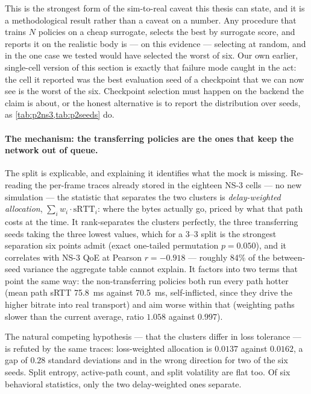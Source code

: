 This is the strongest form of the sim-to-real caveat this thesis can state, and it is a methodological
result rather than a caveat on a number. Any procedure that trains $N$ policies on a cheap surrogate,
selects the best by surrogate score, and reports it on the realistic body is --- on this evidence ---
selecting at random, and in the one case we tested would have selected the worst of six. Our own
earlier, single-cell version of this section is exactly that failure mode caught in the act: the cell it
reported was the best evaluation seed of a checkpoint that we can now see is the worst of the six.
Checkpoint selection must happen on the backend the claim is about, or the honest alternative is to
report the distribution over seeds, as \cref{tab:p2ns3,tab:p2seeds} do.

\paragraph{The mechanism: the transferring policies are the ones that keep the network out of queue.}
The split is explicable, and explaining it identifies what the mock is missing. Re-reading the per-frame
traces already stored in the eighteen NS-3 cells --- no new simulation --- the statistic that separates
the two clusters is \emph{delay-weighted allocation}, $\sum_i w_i \cdot \mathrm{sRTT}_i$: where the bytes
actually go, priced by what that path costs at the time. It rank-separates the clusters perfectly, the
three transferring seeds taking the three lowest values, which for a 3--3 split is the strongest
separation six points admit (exact one-tailed permutation $p = 0.050$), and it correlates with NS-3 QoE
at Pearson $r = -0.918$ --- roughly 84\% of the between-seed variance the aggregate table cannot explain.
It factors into two terms that point the same way: the non-transferring policies both run every path
hotter (mean path sRTT \SI{75.8}{\milli\second} against \SI{70.5}{\milli\second}, self-inflicted, since
they drive the higher bitrate into real transport) and aim worse within that (weighting paths slower
than the current average, ratio $1.058$ against $0.997$).

The natural competing hypothesis --- that the clusters differ in loss tolerance --- is refuted by the
same traces: loss-weighted allocation is $0.0137$ against $0.0162$, a gap of $0.28$ standard deviations
and in the wrong direction for two of the six seeds. Split entropy, active-path count, and split
volatility are flat too. Of six behavioral statistics, only the two delay-weighted ones separate.

